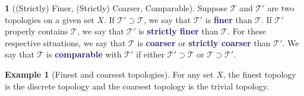 \documentclass[11pt]{article}
\numberwithin{equation}{section}
\newcommand{\navy}[1]{\textcolor{MidnightBlue}{\bf #1}}
\theoremstyle{plain}
\theoremstyle{definition}
\newtheorem{definition}{\color{MidnightBlue}{\textbf{Definition}}}[section]
\newtheorem{example}{\color{WildStrawberry}Example}[section]
\newcommand{\1}{\mathbbm 1}
\newcommand{\tT}{\mathcal T}
\begin{document}

\begin{definition}[(Strictly) Finer, (Strictly) Coarser, Comparable]
	Suppose $\tT$ and $\tT'$ are two topologies on a given set $X$. If $\tT' \supset \tT$, we say that $\tT'$ is \navy{finer} than $\tT$. If $\tT'$ properly contains $\tT$, we say that $\tT'$ is \navy{strictly finer} than $\tT$. For these respective situations, we say that $\tT$ is \navy{coarser} or \navy{strictly coarser} than $\tT'$. We say that $\tT$ is \navy{comparable} with $\tT'$ if either $\tT' \supset \tT$ or $\tT \supset \tT'$.
\end{definition}

\begin{example}[Finest and coarsest topologies]
	For any set $X$, the finest topology is the discrete topology and the coarsest topology is the trivial topology. 
\end{example}
\end{document}

